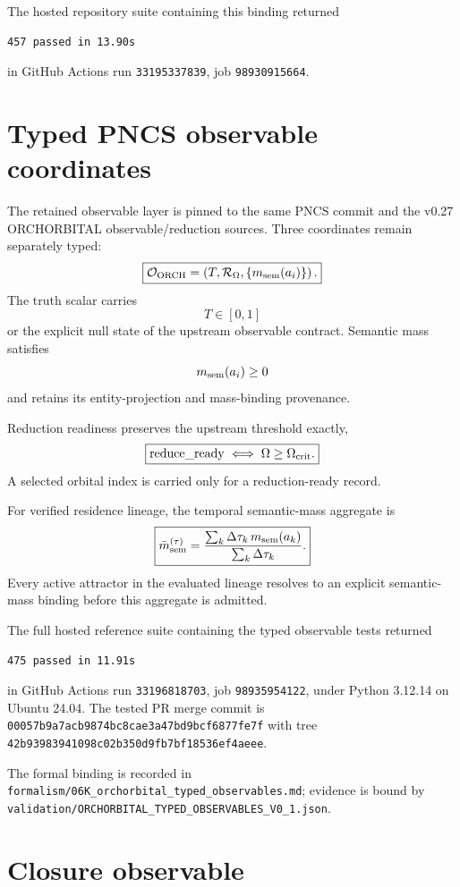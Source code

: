 \documentclass[11pt]{book}
\begin{document}
The hosted repository suite containing this binding returned
\begin{verbatim}
457 passed in 13.90s
\end{verbatim}
in GitHub Actions run \texttt{33195337839}, job \texttt{98930915664}.

\section{Typed PNCS observable coordinates}

The retained observable layer is pinned to the same PNCS commit and the v0.27 ORCHORBITAL observable/reduction sources. Three coordinates remain separately typed:
\[
\boxed{
\mathcal O_{\rm ORCH}
=
\left(
T,
\mathcal R_{\Omega},
\{m_{\rm sem}(a_i)\}
\right).
}
\]
The truth scalar carries
\[
T\in[0,1]
\]
or the explicit null state of the upstream observable contract. Semantic mass satisfies
\[
m_{\rm sem}(a_i)\ge0
\]
and retains its entity-projection and mass-binding provenance.

Reduction readiness preserves the upstream threshold exactly,
\[
\boxed{
\mathrm{reduce\_ready}\iff\Omega\ge\Omega_{\rm crit}.
}
\]
A selected orbital index is carried only for a reduction-ready record.

For verified residence lineage, the temporal semantic-mass aggregate is
\[
\boxed{
\bar m_{\rm sem}^{(\tau)}
=
\frac{\sum_k\Delta\tau_k\,m_{\rm sem}(a_k)}{\sum_k\Delta\tau_k}.
}
\]
Every active attractor in the evaluated lineage resolves to an explicit semantic-mass binding before this aggregate is admitted.

The full hosted reference suite containing the typed observable tests returned
\begin{verbatim}
475 passed in 11.91s
\end{verbatim}
in GitHub Actions run \texttt{33196818703}, job \texttt{98935954122}, under Python 3.12.14 on Ubuntu 24.04. The tested PR merge commit is
\texttt{00057b9a7acb9874bc8cae3a47bd9bcf6877fe7f}
with tree
\texttt{42b93983941098c02b350d9fb7bf18536ef4aeee}.

The formal binding is recorded in \texttt{formalism/06K\_orchorbital\_typed\_observables.md}; evidence is bound by \texttt{validation/ORCHORBITAL\_TYPED\_OBSERVABLES\_V0\_1.json}.

\section{Closure observable}
\end{document}
